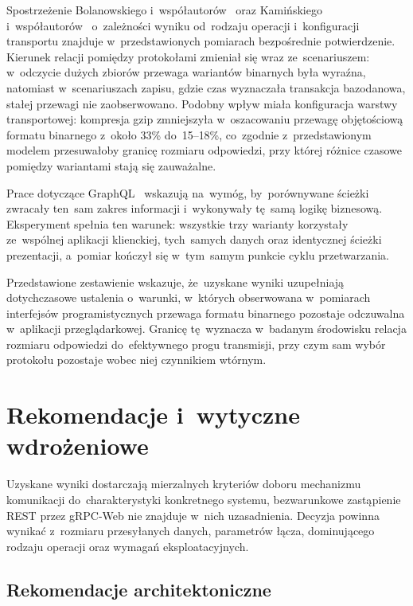 Spostrzeżenie Bolanowskiego i~współautorów~\cite{bib:Bolanowski2022} oraz Kamińskiego i~współautorów~\cite{bib:Kaminski2023} o~zależności wyniku od~rodzaju operacji i~konfiguracji transportu znajduje w~przedstawionych pomiarach bezpośrednie potwierdzenie. Kierunek relacji pomiędzy protokołami zmieniał się wraz ze~scenariuszem: w~odczycie dużych zbiorów przewaga wariantów binarnych była wyraźna, natomiast w~scenariuszach zapisu, gdzie czas wyznaczała transakcja bazodanowa, stałej przewagi nie zaobserwowano. Podobny wpływ miała konfiguracja warstwy transportowej: kompresja gzip zmniejszyła w~oszacowaniu przewagę objętościową formatu binarnego z~około 33\% do~15--18\%, co~zgodnie z~przedstawionym modelem przesuwałoby granicę rozmiaru odpowiedzi, przy której różnice czasowe pomiędzy wariantami stają się zauważalne.

Prace dotyczące GraphQL~\cite{bib:Brito2019,bib:Vadlamani2021,bib:Jin2025} wskazują na~wymóg, by~porównywane ścieżki zwracały ten~sam zakres informacji i~wykonywały tę~samą logikę biznesową. Eksperyment spełnia ten warunek: wszystkie trzy warianty korzystały ze~wspólnej aplikacji klienckiej, tych~samych danych oraz identycznej ścieżki prezentacji, a~pomiar kończył się w~tym~samym punkcie cyklu przetwarzania.

Przedstawione zestawienie wskazuje, że~uzyskane wyniki uzupełniają dotychczasowe ustalenia o~warunki, w~których obserwowana w~pomiarach interfejsów programistycznych przewaga formatu binarnego pozostaje odczuwalna w~aplikacji przeglądarkowej. Granicę tę~wyznacza w~badanym środowisku relacja rozmiaru odpowiedzi do~efektywnego progu transmisji, przy czym sam wybór protokołu pozostaje wobec niej czynnikiem wtórnym.

\section{Rekomendacje i~wytyczne wdrożeniowe}
\label{sec:RekomendacjeArchitektoniczne}

Uzyskane wyniki dostarczają mierzalnych kryteriów doboru mechanizmu komunikacji do~charakterystyki konkretnego systemu, bezwarunkowe zastąpienie REST przez gRPC-Web nie znajduje w~nich uzasadnienia. Decyzja powinna wynikać z~rozmiaru przesyłanych danych, parametrów łącza, dominującego rodzaju operacji oraz wymagań eksploatacyjnych.

\subsection{Rekomendacje architektoniczne}

